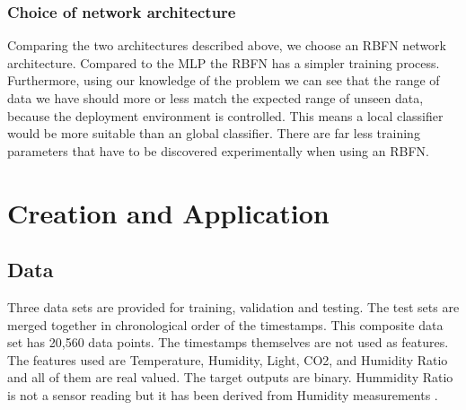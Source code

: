 \documentclass[a4paper, 11pt]{article}
\begin{document}

\subsubsection{Choice of network architecture}
Comparing the two architectures described above, we choose an RBFN network architecture. Compared to the MLP the RBFN has a simpler training process. Furthermore, using our knowledge of the problem we can see that the range of data we have should more or less match the expected range of unseen data, because the deployment environment is controlled. This means a local classifier would be more suitable than an global classifier. There are far less training parameters that have to be discovered experimentally when using an RBFN.

\section{Creation and Application}

\subsection{Data}
Three data sets are provided for training, validation and testing. The test sets are merged together in chronological order of the timestamps. This composite data set has 20,560 data points. The timestamps themselves are not used as features. The features used are Temperature, Humidity, Light, CO2, and Humidity Ratio and all of them are real valued. The target outputs are binary. Hummidity Ratio is not a sensor reading but it has been derived from Humidity measurements \cite{Candanedo2016}.
\end{document}
